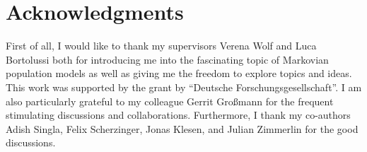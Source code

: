 



\vspace{3cm}

\begingroup
\let\clearpage\relax
\let\cleardoublepage\relax
\let\cleardoublepage\relax
\chapter*{Acknowledgments}
First of all, I would like to thank my supervisors Verena Wolf and Luca Bortolussi both for introducing me into the fascinating topic of Markovian population models as well as giving me the freedom to explore topics and ideas.
This work was supported by the  grant by ``Deutsche Forschungsgesellschaft''.
I am also particularly grateful to my colleague Gerrit Großmann for the frequent stimulating discussions and collaborations.
Furthermore, I thank my co-authors Adish Singla, Felix Scherzinger, Jonas Klesen, and Julian Zimmerlin for the good discussions.



\endgroup
